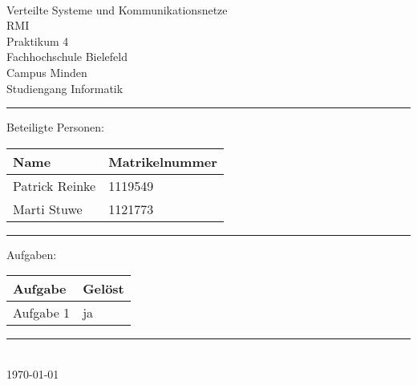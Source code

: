 


\begin{titlepage}
   \mbox{}\vspace{5\baselineskip}\\
   \sffamily\huge
   \centering
   {\Huge Verteilte Systeme und Kommunikationsnetze} \\
  RMI \\ \normalsize Praktikum  4
   \vspace{3\baselineskip}\\
   \rmfamily\Large
  Fachhochschule Bielefeld \\
  Campus Minden \\
  Studiengang Informatik
   \vspace{2\baselineskip}\\
\noindent\rule{15cm}{0.4pt}
Beteiligte Personen:
\begin{table}[H]
	\tablestyle
	\begin{tabular}{*{2}{v{0.45\textwidth}}}
		\hline
		\textbf{Name} &
		\textbf{Matrikelnummer} \tabularnewline
		\hline
		Patrick Reinke  & 1119549 \tabularnewline
		Marti Stuwe  & 1121773 \tabularnewline
	\end{tabular}
\end{table}

\centering
\noindent\rule{15cm}{0.4pt}
{\Large Aufgaben:}
\begin{table}[H]
	\tablestyle
	\begin{tabular}{*{2}{v{0.45\textwidth}}}
		\hline
		\textbf{Aufgabe} &
		\textbf{Gelöst} \tabularnewline
		\hline
		Aufgabe 1 & ja \tabularnewline
	\end{tabular}
\end{table}
   \noindent\rule{15cm}{0.4pt}
      \vspace{1\baselineskip}\\
   \today
\end{titlepage}

